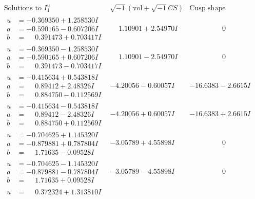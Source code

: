 \documentclass[1p]{elsarticle_modified}
\theoremstyle{definition}
\newcommand{\I}{\sqrt{-1}}
\begin{document}
$$\begin{array}{c|c|c}
\text{Solutions to }I^u_{1}& \I (\text{vol} + \sqrt{-1}CS) & \text{Cusp shape}\\
 \hline 
\begin{aligned}
u &= -0.369350 + 1.258530 I \\
a &= -0.590165 - 0.607206 I \\
b &= \phantom{-}0.391473 + 0.703417 I\end{aligned}
 & \phantom{-}1.10901 + 2.54970 I & \phantom{-0.000000 } 0 \\ \hline\begin{aligned}
u &= -0.369350 - 1.258530 I \\
a &= -0.590165 + 0.607206 I \\
b &= \phantom{-}0.391473 - 0.703417 I\end{aligned}
 & \phantom{-}1.10901 - 2.54970 I & \phantom{-0.000000 } 0 \\ \hline\begin{aligned}
u &= -0.415634 + 0.543818 I \\
a &= \phantom{-}0.89412 + 2.48326 I \\
b &= \phantom{-}0.884750 - 0.112569 I\end{aligned}
 & -4.20056 - 0.60057 I & -16.6383 - 2.6615 I \\ \hline\begin{aligned}
u &= -0.415634 - 0.543818 I \\
a &= \phantom{-}0.89412 - 2.48326 I \\
b &= \phantom{-}0.884750 + 0.112569 I\end{aligned}
 & -4.20056 + 0.60057 I & -16.6383 + 2.6615 I \\ \hline\begin{aligned}
u &= -0.704625 + 1.145320 I \\
a &= -0.879881 + 0.787804 I \\
b &= \phantom{-}1.71635 - 0.09528 I\end{aligned}
 & -3.05789 + 4.55898 I & \phantom{-0.000000 } 0 \\ \hline\begin{aligned}
u &= -0.704625 - 1.145320 I \\
a &= -0.879881 - 0.787804 I \\
b &= \phantom{-}1.71635 + 0.09528 I\end{aligned}
 & -3.05789 - 4.55898 I & \phantom{-0.000000 } 0 \\ \hline\begin{aligned}
u &= \phantom{-}0.372324 + 1.313810 I \\

\end{aligned}
\end{array}$$
\end{document}
